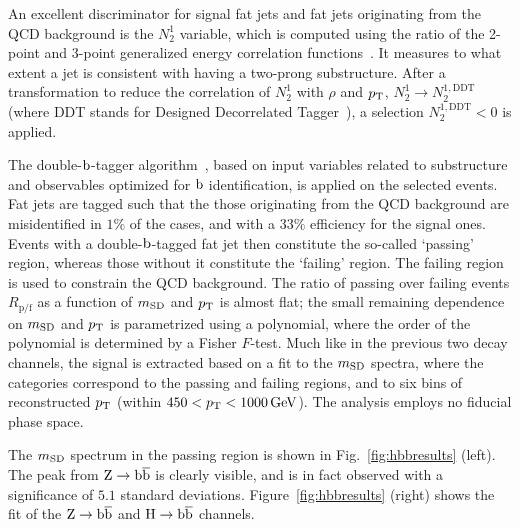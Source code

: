 An excellent discriminator for signal fat jets and fat jets originating from the QCD background is the $N^1_2$ variable, which is computed using the ratio of the 2-point and 3-point generalized energy correlation functions~\cite{Larkoski:2013eya}.
% 
It measures to what extent a jet is consistent with having a two-prong substructure.
% 
After a transformation to reduce the correlation of $N^1_2$ with $\rho$ and $p_\mathrm{T}$, $N^1_2 \to N_2^{1,\text{DDT}}$ (where DDT stands for Designed Decorrelated Tagger~\cite{Dolen:2016kst}), a selection $N_2^{1,\text{DDT}} < 0$ is applied.


The double-$\mathrm{b}$-tagger algorithm~\cite{Sirunyan:2017ezt}, based on input variables related to substructure and observables optimized for $\mathrm{b}$ identification, is applied on the selected events.
% 
Fat jets are tagged such that the those originating from the QCD background are misidentified in $1\%$ of the cases, and with a $33\%$ efficiency for the signal ones.
% 
Events with a double-$\mathrm{b}$-tagged fat jet then constitute the so-called `passing' region, whereas those without it constitute the `failing' region.
% 
The failing region is used to constrain the QCD background.
% 
The ratio of passing over failing events $R_\text{p/f}$ as a function of $m_\mathrm{SD}$ and $p_\mathrm{T}$ is almost flat; the small remaining dependence on $m_\mathrm{SD}$ and $p_\mathrm{T}$ is parametrized using a polynomial, where the order of the polynomial is determined by a Fisher $F$-test.
% 
Much like in the previous two decay channels, the signal is extracted based on a fit to the $m_\mathrm{SD}$ spectra, where the categories correspond to the passing and failing regions, and to six bins of reconstructed $p_\mathrm{T}$ (within $450 < p_\mathrm{T} < 1000\,\text{GeV}$).
% 
The analysis employs no fiducial phase space.


The $m_\mathrm{SD}$ spectrum in the passing region is shown in Fig.~\ref{fig:hbbresults} (left).
% 
The peak from $\mathrm{Z}\to\mathrm{b}\overline{\mathrm{b}}$ is clearly visible, and is in fact observed with a significance of $5.1$ standard deviations.
% 
Figure~\ref{fig:hbbresults} (right) shows the fit of the $\mathrm{Z}\to\mathrm{b}\overline{\mathrm{b}}$ and $\mathrm{H}\to\mathrm{b}\overline{\mathrm{b}}$ channels.


